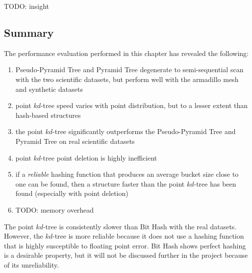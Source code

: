 TODO: insight

\subsection{Summary}

The performance evaluation performed in this chapter has revealed the following:
\begin{enumerate}
	\item Pseudo-Pyramid Tree and Pyramid Tree degenerate to semi-sequential scan with the two scientific datasets, but perform well with the armadillo mesh and synthetic datasets
	\item point $kd$-tree speed varies with point distribution, but to a lesser extent than hash-based structures
	\item the point $kd$-tree significantly outperforms the Pseudo-Pyramid Tree and Pyramid Tree on real scientific datasets
	\item point $kd$-tree point deletion is highly inefficient
	\item if a \textit{reliable} hashing function that produces an average bucket size close to one can be found, then a structure faster than the point $kd$-tree has been found (especially with point deletion)
	\item TODO: memory overhead
\end{enumerate}

The point $kd$-tree is consistently slower than Bit Hash with the real datasets. However, the $kd$-tree is more reliable because it does not use a hashing function that is highly susceptible to floating point error. Bit Hash shows perfect hashing is a desirable property, but it will not be discussed further in the project because of its unreliability.